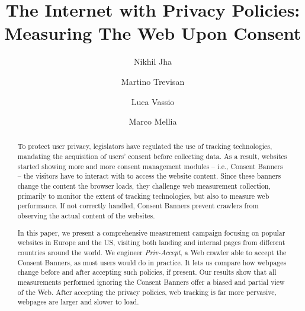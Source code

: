 \documentclass[acmsmall,authorversion]{acmart}
\newcommand{\TOOL}{{\emph{Priv-Accept}}\xspace}
\begin{document}
\title[The Internet with Privacy Policies]{The Internet with Privacy Policies: Measuring The Web Upon Consent}

\author{Nikhil Jha}

\author{Martino Trevisan}

\author{Luca Vassio}

\author{Marco Mellia}

\begin{abstract}
To protect user privacy, legislators have regulated the use of tracking technologies, mandating the acquisition of users' consent before collecting data. As a result, websites started showing more and more consent management modules -- i.e., Consent Banners -- the visitors have to interact with to access the website content. Since these banners change the content the browser loads, they challenge web measurement collection, primarily to monitor the extent of tracking technologies, but also to measure web performance. If not correctly handled, Consent Banners prevent crawlers from observing the actual content of the websites.

In this paper, we present a comprehensive measurement campaign focusing on popular websites in Europe and the US, visiting both landing and internal pages from different countries around the world. We engineer \TOOL, a Web crawler able to accept the Consent Banners, as most users would do in practice. It lets us compare how webpages change before and after accepting such policies, if present. Our results show that all measurements performed ignoring the Consent Banners offer a biased and partial view of the Web. After accepting the privacy policies, web tracking is far more pervasive, webpages are larger and slower to load.
\end{abstract}
\end{document}
